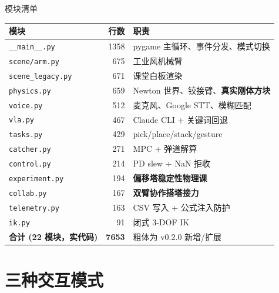 \documentclass[aspectratio=169, 11pt]{beamer}
\begin{document}
\begin{frame}[fragile]{模块清单}
\centering\small
\begin{tabular}{lrl}
\toprule
模块 & 行数 & 职责 \\
\midrule
\texttt{\_\_main\_\_.py}    & 1358 & pygame 主循环、事件分发、模式切换 \\
\texttt{scene/arm.py}       &  675 & 工业风机械臂 \\
\texttt{scene\_legacy.py}   &  671 & 课堂白板渲染 \\
\texttt{physics.py}         &  659 & Newton 世界、铰接臂、\textbf{真实刚体方块} \\
\texttt{voice.py}           &  512 & 麦克风、Google STT、模糊匹配 \\
\texttt{vla.py}             &  467 & Claude CLI + 关键词回退 \\
\texttt{tasks.py}           &  429 & pick/place/stack/gesture \\
\texttt{catcher.py}         &  271 & MPC + 弹道解算 \\
\texttt{control.py}         &  214 & PD slew + NaN 拒收 \\
\texttt{experiment.py}      &  194 & \textbf{偏移塔稳定性物理课} \\
\texttt{collab.py}          &  167 & \textbf{双臂协作搭塔接力} \\
\texttt{telemetry.py}       &  163 & CSV 写入 + 公式注入防护 \\
\texttt{ik.py}              &   91 & 闭式 3-DOF IK \\
\midrule
\textbf{合计 (22 模块，实代码)} & \textbf{7653} & \footnotesize 粗体为 v0.2.0 新增/扩展 \\
\bottomrule
\end{tabular}
\end{frame}

\section{三种交互模式}
\end{document}
